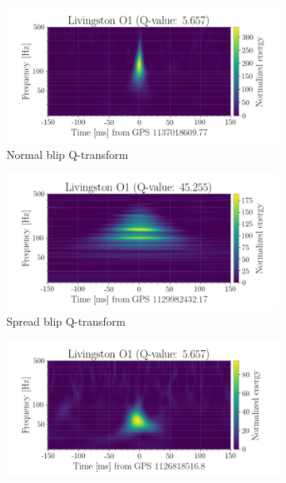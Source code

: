 \documentclass[a4paper]{article}
\begin{document}
\begin{figure}[h!]
	\centering
	\begin{subfigure}{.49\textwidth}
		\centering
		\includegraphics[width=1\linewidth]{normal_blip}
		\caption{Normal blip Q-transform}
		\label{fig:normal}
	\end{subfigure}
	\begin{subfigure}{.49\textwidth}
		\centering
		\includegraphics[width=1\linewidth]{spread_blip}
		\caption{Spread blip Q-transform}
		\label{fig:spread}
	\end{subfigure}
	\begin{subfigure}{.49\textwidth}
		\centering
		\includegraphics[width=1\linewidth]{dot_blip}

\end{subfigure}
\end{figure}
\end{document}
